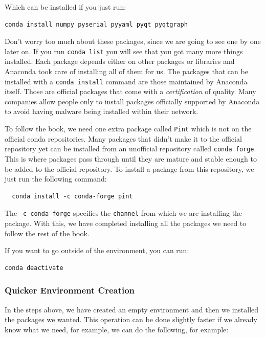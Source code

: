 Which can be installed if you just run:

\begin{verbatim}
conda install numpy pyserial pyyaml pyqt pyqtgraph
\end{verbatim}

Don't worry too much about these packages, since we are going to see one by one later on. If you run \texttt{conda list} you will see that you got many more things installed. Each package depends either on other packages or libraries and Anaconda took care of installing all of them for us. The packages that can be installed with a \texttt{conda install} command are those maintained by Anaconda itself. Those are official packages that come with a \emph{certification} of quality. Many companies allow people only to install packages officially supported by Anaconda to avoid having malware being installed within their network.

To follow the book, we need one extra package called \texttt{Pint} which is not on the official conda repositories. Many packages that didn't make it to the official repository yet can be installed from an unofficial repository called \texttt{conda forge}. This is where packages pass through until they are mature and stable enough to be added to the official repository. To install a package from this repository, we just run the following command:

\begin{verbatim}
  conda install -c conda-forge pint
\end{verbatim}

The \texttt{-c conda-forge} specifies the \texttt{channel} from which we are installing the package. With this, we have completed installing all the packages we need to follow the rest of the book. 

If you want to go outside of the environment, you can run:

\begin{verbatim}
conda deactivate
\end{verbatim}

\subsubsection{Quicker Environment Creation}
In the steps above, we have created an empty environment and then we installed the packages we wanted. This operation can be done slightly faster if we already know what we need, for example, we can do the following, for example:

